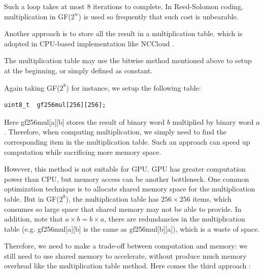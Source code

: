 \documentclass[a4paper]{article}
\begin{document}
Such a loop takes at most 8 iterations to complete.
In Reed-Solomon coding, multiplication in GF($2^w$) is used so frequently that such cost is unbearable.


Another approach is to store all the result in a multiplication table.
which is adopted in CPU-based implementation 
like NCCloud \cite{hu2012nccloud}.

The multiplication table may use 
the bitwise method
mentioned above 
to setup at the beginning, or simply defined as constant. 

Again taking GF($2^8$) for instance, we setup the following table:
\begin{verbatim}
uint8_t  gf256mul[256][256];
\end{verbatim}
Here gf256mul[a][b] stores the result of binary word $b$ multiplied by binary word $a$.
Therefore, when computing multiplication, we simply need to find the corresponding item in the multiplication table.
Such an approach can speed up computation while sacrificing more memory space.

However, 
this method is not suitable for GPU.
GPU has greater computation power than CPU, but memory access can be another bottleneck. One common optimization technique is to allocate shared memory space for the multiplication table.
But in GF($2^8$),
the multiplication table has $256 \times 256$ items, which consumes so large space that shared memory may not be able to provide.
In addition, note that $a \times b = b \times a$, there are redundancies in the multiplication table (e.g. gf256mul[a][b] is the same as gf256mul[b][a]), which is a waste of space.


Therefore, we need to make a trade-off between computation and memory: 
we still need to use shared memory to accelerate,
without produce much memory overhead like the multiplication table method.
Here comes the third approach \cite{plank1997tutorial}:


\end{document}
